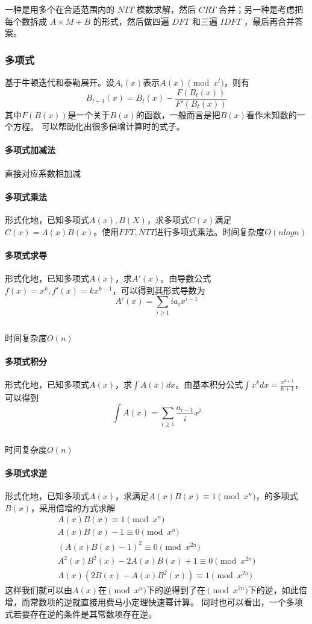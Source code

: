 \documentclass[UTF-8]{ctexart}
\newcommand{\cpp}[1]{\inputminted[bgcolor=bg,breaklines,breakanywhere=true]{c++}{#1}}
\begin{document}
			一种是用多个在合适范围内的 $NTT$ 模数求解，然后 $CRT$ 合并；另一种是考虑把每个数拆成 $A \times M+B$ 的形式，然后做四遍 $DFT$ 和三遍 $IDFT$ ，最后再合并答案。
			\subsubsection{多项式}
			基于牛顿迭代和泰勒展开。设$A _ t(x)$表示$A(x) \pmod{x^{t}}$，则有
			$$B _ {t+1}(x)=B _ t(x)-\frac{F(B _ t(x))}{F'(B _ t(x))}$$
			其中$F(B(x))$是一个关于$B(x)$的函数，一般而言是把$B(x)$看作未知数的一个方程。  
			可以帮助化出很多倍增计算时的式子。
			\paragraph{多项式加减法} 直接对应系数相加减
			\paragraph{多项式乘法} 形式化地，已知多项式$A(x),B(X)$，求多项式$C(x)$满足$C(x)=A(x)B(x)$。使用$FFT,NTT$进行多项式乘法。时间复杂度$O(nlogn)$
			\paragraph{多项式求导}形式化地，已知多项式$A(x)$，求$A'(x)$。由导数公式$f(x)=x^k,f'(x)=kx^{k-1}$，可以得到其形式导数为
			$$A'(x)=\sum _ {i \ge 1}ia _ {i}x^{i-1}$$
			\cpp{code//Math//PolyDery.cpp}
			时间复杂度$O(n)$
			\paragraph{多项式积分}形式化地，已知多项式$A(x)$，求$\int A(x)dx$。由基本积分公式$\int x^kdx=\frac{x^{k+1}}{k+1}$，可以得到
			$$\int A(x)=\sum _ {i \ge 1}\frac{a _ {i-1}}{i}x^i$$
			\cpp{code//Math//polyinte.cpp}
			时间复杂度$O(n)$
			\paragraph{多项式求逆}形式化地，已知多项式$A(x)$，求满足$A(x)B(x) \equiv 1 \pmod {x^n} $，的多项式$B(x)$，采用倍增的方式求解
			\begin{align}
			A(x)B(x) \equiv 1 \pmod{x^n} \nonumber\\ A(x)B(x)-1 \equiv 0 \pmod{x^n} \nonumber\\ (A(x)B(x)-1)^2 \equiv 0 \pmod {x^{2n}} \nonumber\\ A^2(x)B^2(x)-2A(x)B(x)+1 \equiv 0 \pmod{x^{2n}} \nonumber\\ A(x)(2B(x)-A(x)B^2(x)) \equiv 1 \pmod {x^{2n}}\nonumber
			\end{align}
			这样我们就可以由$A(x)$在$\pmod{x^n}$下的逆得到了在$\pmod{x^{2n}}$下的逆，如此倍增，而常数项的逆就直接用费马小定理快速幂计算。  
			同时也可以看出，一个多项式若要存在逆的条件是其常数项存在逆。
			
\end{document}
